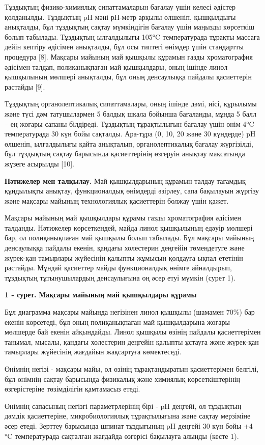 \begin{multicols}{2}
Тұздықтың физико-химиялық сипаттамаларын бағалау үшін келесі әдістер
қолданылды. Тұздықтың pH мәні рН-метр арқылы өлшеніп, қышқылдығы
анықталды, бұл тұздықтың сақтау мүмкіндігін бағалау үшін маңызды
көрсеткіш болып табылады. Тұздықтың ылғалдылығы 105°C температурада
тұрақты массаға дейін кептіру әдісімен анықталды, бұл осы типтегі
өнімдер үшін стандартты процедура {[}8{]}. Мақсары майының май қышқылы
құрамын газды хроматография әдісімен талдап, полиқанықпаған май
қышқылдары, оның ішінде линол қышқылының мөлшері анықталды, бұл оның
денсаулыққа пайдалы қасиеттерін растайды {[}9{]}.

Тұздықтың органолептикалық сипаттамалары, оның ішінде дәмі, иісі,
құрылымы және түсі дәм татушылармен 5 балдық шкала бойынша бағаланды,
мұнда 5 балл -- ең жоғары сапаны білдіреді. Тұздықтың тұрақтылығын
бағалау үшін өнім 4°C температурада 30 күн бойы сақталды. Ара-тұра (0,
10, 20 және 30 күндерде) pH өлшеніп, ылғалдылығы қайта анықталып,
органолептикалық бағалау жүргізілді, бұл тұздықтың сақтау барысында
қасиеттерінің өзгеруін анықтау мақсатында жүзеге асырылды {[}10{]}.

{\bfseries Нәтижелер мен талқылау.} Май қышқылдарының құрамын талдау
тағамдық құндылықты анықтау, функционалдық өнімдерді әзірлеу, сапа
бақылауын жүргізу және мақсары майының технологиялық қасиеттерін болжау
үшін қажет.

Мақсары майының май қышқылдары құрамы газды хроматография әдісімен
талданды. Нәтижелер көрсеткендей, майда линол қышқылының едәуір мөлшері
бар, ол полиқанықпаған май қышқылы болып табылады. Бұл мақсары майының
денсаулыққа пайдалы екенін, қандағы холестерин деңгейін төмендетуге және
жүрек-қан тамырлары жүйесінің қалыпты жұмысын қолдауға ықпал ететінін
растайды. Мұндай қасиеттер майды функционалдық өнімге айналдырып,
тұздықтың тұтынушылардың денсаулығына оң әсер етуі мүмкін (сурет 1).
\end{multicols}

{\bfseries 1 - сурет. Мақсары майының май қышқылдары құрамы}

\begin{multicols}{2}
Бұл диаграмма мақсары майында негізінен линол қышқылы (шамамен 70\%) бар
екенін көрсетеді, бұл оның полиқанықпаған май қышқылдарына жоғары
мөлшерде бай екенін айқындайды. Линол қышқылы өзінің пайдалы
қасиеттерімен танымал, мысалы, қандағы холестерин деңгейін қалыпты
ұстауға және жүрек-қан тамырлары жүйесінің жағдайын жақсартуға
көмектеседі.

Өнімнің негізі - мақсары майы, ол өзінің тұрақтандыратын қасиеттерімен
белгілі, бұл өнімнің сақтау барысында физикалық және химиялық
көрсеткіштерінің өзгерістеріне төзімділігін қамтамасыз етеді.

Өнімнің сапасының негізгі параметрлерінің бірі - pH деңгейі, ол
тұздықтың дәмдік қасиеттеріне, микробиологиялық тұрақтылығына және
сақтау мерзіміне әсер етеді. Зерттеу барысында шпинат тұздығының pH
деңгейі 30 күн бойы +4 °C температурада сақталған жағдайда өзгерісі
бақылауға алынды (кесте 1).
\end{multicols}

